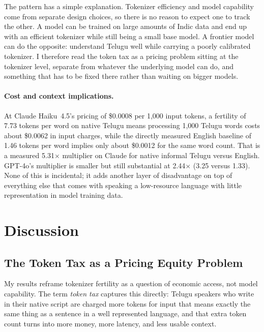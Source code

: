 ﻿\documentclass[11pt]{article}
\begin{document}
The pattern has a simple explanation. Tokenizer efficiency and model
capability come from separate design choices, so there is no reason
to expect one to track the other. A model can be trained on large
amounts of Indic data and end up with an efficient tokenizer while
still being a small base model. A frontier model can do the
opposite: understand Telugu well while carrying a poorly calibrated
tokenizer. I therefore read the token tax as a pricing problem
sitting at the tokenizer level, separate from whatever the
underlying model can do, and something that has to be fixed there
rather than waiting on bigger models.

\paragraph{Cost and context implications.}
At Claude Haiku~4.5's pricing of \$0.0008 per 1,000 input tokens, a
fertility of 7.73 tokens per word on native Telugu means processing
1,000 Telugu words costs about \$0.0062 in input charges, while the
directly measured English baseline of 1.46 tokens per word implies
only about \$0.0012 for the same word count. That is a measured
5.31$\times$ multiplier on Claude for native informal Telugu versus
English. GPT-4o's multiplier is smaller but still substantial at
2.44$\times$ (3.25 versus 1.33). None of this is incidental; it adds
another layer of disadvantage on top of everything else that comes
with speaking a low-resource language with little representation in
model training data.




\section{Discussion}
\label{sec:discussion}

\subsection{The Token Tax as a Pricing Equity Problem}

My results reframe tokenizer fertility as a question of economic
access, not model capability. The term \textit{token tax} captures
this directly: Telugu speakers who write in their native script are
charged more tokens for input that means exactly the same thing as a
sentence in a well represented language, and that extra token count
turns into more money, more latency, and less usable context.
\end{document}
